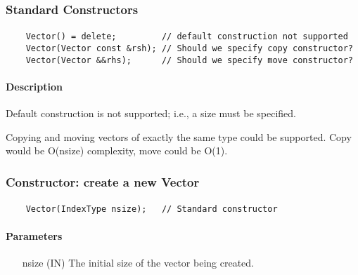 \subsubsection{Standard Constructors}

\paragraph{\syntax}

\begin{verbatim}
    Vector() = delete;         // default construction not supported
    Vector(Vector const &rsh); // Should we specify copy constructor?
    Vector(Vector &&rhs);      // Should we specify move constructor?
\end{verbatim}

\paragraph{Description}


Default construction is not supported; i.e., a size must be specified.

Copying and moving vectors of exactly the same type could be supported.  
Copy would be O(nsize) complexity, move could be O(1).


\subsubsection{Constructor: create a new Vector}

\paragraph{\syntax}

\begin{verbatim}
    Vector(IndexType nsize);   // Standard constructor
\end{verbatim}

\paragraph{Parameters}

\begin{itemize}[leftmargin=1.1in]
    \item[{\sf nsize}] ({\sf IN}) The initial size of the vector being created.
\end{itemize}

